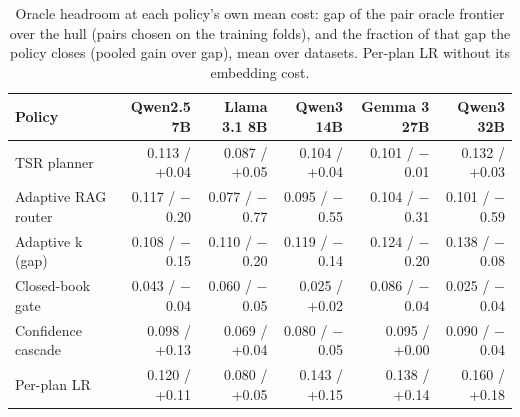 \begin{table}[t]
\centering\small
\setlength{\tabcolsep}{4pt}
\caption{Oracle headroom at each policy's own mean cost: gap of the pair oracle frontier over the hull (pairs chosen on the training folds), and the fraction of that gap the policy closes (pooled gain over gap), mean over datasets. Per-plan LR without its embedding cost.}
\label{tab:robust_headroom}
\begin{tabular*}{\linewidth}{@{\extracolsep{\fill}}lrrrrr}
\toprule
Policy & Qwen2.5 7B & Llama 3.1 8B & Qwen3 14B & Gemma 3 27B & Qwen3 32B \\
\midrule
TSR planner & 0.113 / +0.04 & 0.087 / +0.05 & 0.104 / +0.04 & 0.101 / $-$0.01 & 0.132 / +0.03 \\
Adaptive RAG router & 0.117 / $-$0.20 & 0.077 / $-$0.77 & 0.095 / $-$0.55 & 0.104 / $-$0.31 & 0.101 / $-$0.59 \\
Adaptive k (gap) & 0.108 / $-$0.15 & 0.110 / $-$0.20 & 0.119 / $-$0.14 & 0.124 / $-$0.20 & 0.138 / $-$0.08 \\
Closed-book gate & 0.043 / $-$0.04 & 0.060 / $-$0.05 & 0.025 / +0.02 & 0.086 / $-$0.04 & 0.025 / $-$0.04 \\
Confidence cascade & 0.098 / +0.13 & 0.069 / +0.04 & 0.080 / $-$0.05 & 0.095 / +0.00 & 0.090 / $-$0.04 \\
Per-plan LR & 0.120 / +0.11 & 0.080 / +0.05 & 0.143 / +0.15 & 0.138 / +0.14 & 0.160 / +0.18 \\
\bottomrule
\end{tabular*}
\end{table}

